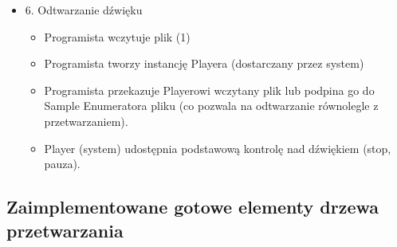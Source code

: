 \begin{itemize}
\begin{itemize}
	\end{itemize}
	\item 6. Odtwarzanie dźwięku
	\begin{itemize}
		\item Programista wczytuje plik (1)
		\item Programista tworzy instancję Playera (dostarczany przez system)
		\item Programista przekazuje Playerowi wczytany plik lub podpina go do Sample Enumeratora pliku (co pozwala na odtwarzanie równolegle z przetwarzaniem).
		\item Player (system) udostępnia podstawową kontrolę nad dźwiękiem (stop, pauza).
	\end{itemize}
\end{itemize}
\subsection{Zaimplementowane gotowe elementy drzewa przetwarzania}
